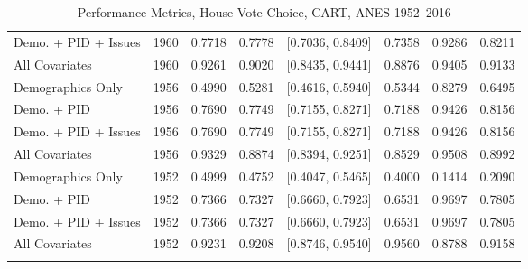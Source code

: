 \begin{longtable}{lrrrlrrr}
  Demo. + PID + Issues & 1960 & 0.7718 & 0.7778 & [0.7036, 0.8409] & 0.7358 & 0.9286 & 0.8211 \\ 
  All Covariates & 1960 & 0.9261 & 0.9020 & [0.8435, 0.9441] & 0.8876 & 0.9405 & 0.9133 \\ 
  Demographics Only & 1956 & 0.4990 & 0.5281 & [0.4616, 0.5940] & 0.5344 & 0.8279 & 0.6495 \\ 
  Demo. + PID & 1956 & 0.7690 & 0.7749 & [0.7155, 0.8271] & 0.7188 & 0.9426 & 0.8156 \\ 
  Demo. + PID + Issues & 1956 & 0.7690 & 0.7749 & [0.7155, 0.8271] & 0.7188 & 0.9426 & 0.8156 \\ 
  All Covariates & 1956 & 0.9329 & 0.8874 & [0.8394, 0.9251] & 0.8529 & 0.9508 & 0.8992 \\ 
  Demographics Only & 1952 & 0.4999 & 0.4752 & [0.4047, 0.5465] & 0.4000 & 0.1414 & 0.2090 \\ 
  Demo. + PID & 1952 & 0.7366 & 0.7327 & [0.6660, 0.7923] & 0.6531 & 0.9697 & 0.7805 \\ 
  Demo. + PID + Issues & 1952 & 0.7366 & 0.7327 & [0.6660, 0.7923] & 0.6531 & 0.9697 & 0.7805 \\ 
  All Covariates & 1952 & 0.9231 & 0.9208 & [0.8746, 0.9540] & 0.9560 & 0.8788 & 0.9158 \\ 
   \bottomrule
\caption{Performance Metrics, House Vote Choice, CART, ANES 1952--2016} 
\label{tab:ANES_house_cart}
\end{longtable}
